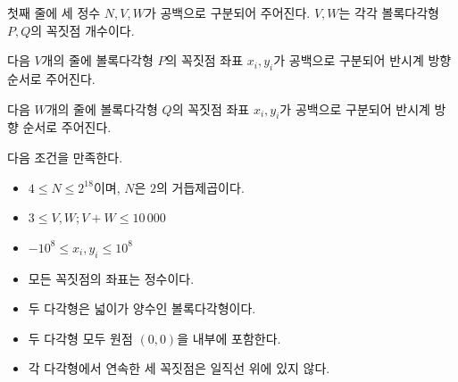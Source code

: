 
첫째 줄에 세 정수 $N,V,W$가 공백으로 구분되어 주어진다. $V,W$는 각각 볼록다각형 $P,Q$의 꼭짓점 개수이다.

다음 $V$개의 줄에 볼록다각형 $P$의 꼭짓점 좌표 $x_i,y_i$가 공백으로 구분되어 반시계 방향 순서로 주어진다.

다음 $W$개의 줄에 볼록다각형 $Q$의 꼭짓점 좌표 $x_i,y_i$가 공백으로 구분되어 반시계 방향 순서로 주어진다.

다음 조건을 만족한다.

\begin{itemize}
\item $4\le N\le 2^{18}$이며, $N$은 $2$의 거듭제곱이다.
\item $3\le V,W;V+W\le 10\,000$
\item $-10^8\le x_i,y_i\le 10^8$
\item 모든 꼭짓점의 좌표는 정수이다.
\item 두 다각형은 넓이가 양수인 볼록다각형이다.
\item 두 다각형 모두 원점 $(0,0)$을 내부에 포함한다.
\item 각 다각형에서 연속한 세 꼭짓점은 일직선 위에 있지 않다.
\end{itemize}
